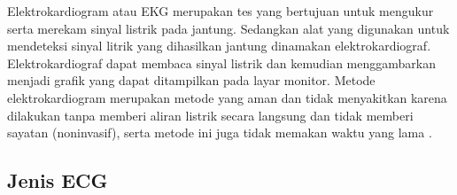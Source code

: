 Elektrokardiogram atau EKG merupakan tes yang bertujuan untuk mengukur serta merekam sinyal listrik pada jantung. Sedangkan alat yang digunakan untuk mendeteksi sinyal litrik yang dihasilkan jantung dinamakan elektrokardiograf. Elektrokardiograf dapat membaca sinyal listrik dan kemudian menggambarkan menjadi grafik yang dapat ditampilkan pada layar monitor. Metode elektrokardiogram merupakan metode yang  aman dan tidak menyakitkan karena dilakukan tanpa memberi aliran listrik secara langsung dan tidak memberi sayatan (noninvasif), serta metode ini juga tidak memakan waktu yang lama \cite{cit:13}. 

\subsection{Jenis ECG}
\vspace{1ex}

